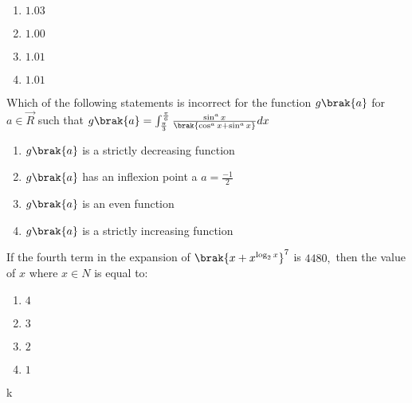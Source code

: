     \begin{enumerate}
        \item $1.03$
        \item $1.00$
        \item $1.01$
        \item $1.01$\\
    \end{enumerate}
    \item Which of the following statements is incorrect for the function $g\brak{a}$ for $a\in\Vec{R}$ such that $g\brak{a}=\int_{\frac{\pi}{3}}^{\frac{\pi}{6}}\frac{\sin^a{x}}{\brak{\cos^a{x}+\sin^a{x}}}dx$
    \begin{enumerate}
        \item $g\brak{a}$ is a strictly decreasing function
        \item $g\brak{a}$ has an inflexion point a $a=\frac{-1}{2}$
        \item $g\brak{a}$ is an even function
        \item $g\brak{a}$ is a strictly increasing function\\
    \end{enumerate}
    \item If the fourth term in the expansion of $\brak{x+x^{\log_{2}x}}^7$ is $4480,$ then the value of $x$ where $x\in N$ is equal to:
    \begin{enumerate}
        \item $4$
        \item $3$
        \item $2$
        \item $1$
    \end{enumerate}  k
